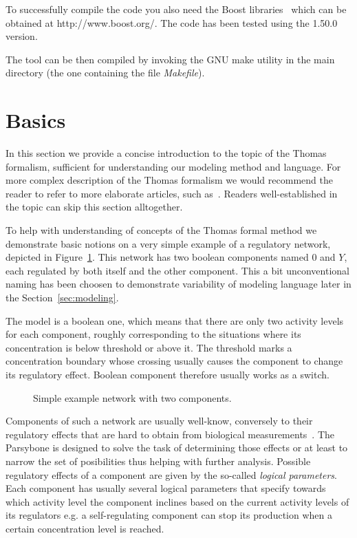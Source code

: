 \documentclass[12pt]{article}
\begin{document}
To successfully compile the code you also need the Boost libraries~\cite{Boost} which can be obtained at http://www.boost.org/. The code has been tested using the 1.50.0 version.

The tool can be then compiled by invoking the GNU make utility in the main directory (the one containing the file \emph{Makefile}).

\section{Basics}
In this section we provide a concise introduction to the topic of the Thomas formalism, sufficient for understanding our modeling method and language. For more complex description of the Thomas formalism we would recommend the reader to refer to more elaborate articles, such as~\cite{ThomasR1991}. Readers well-established in the topic can skip this section alltogether.

To help with understanding of concepts of the Thomas formal method we demonstrate basic notions on a very simple example of a regulatory network, depicted in Figure~\ref{ExampNet}. This network has two boolean components named $0$ and $Y$, each regulated by both itself and the other component. This a bit unconventional naming has been choosen to demonstrate variability of modeling language later in the Section~\ref{sec:modeling}.

The model is a boolean one, which means that there are only two activity levels for each component, roughly corresponding to the situations where its concentration is below threshold or above it. The threshold marks a concentration boundary whose crossing usually causes the component to change its regulatory effect. Boolean component therefore usually works as a switch.

\begin{figure}[b]
\centering
{}
\caption{Simple example network with two components.}
\label{ExampNet}
\end{figure}

Components of such a network are usually well-know, conversely to their regulatory effects that are hard to obtain from biological measurements~\cite{Hecker09}. The Parsybone is designed to solve the task of determining those effects or at least to narrow the set of posibilities thus helping with further analysis. Possible regulatory effects of a component are given by the so-called \emph{logical parameters}. Each component has usually several logical parameters that specify towards which activity level the component inclines based on the current activity levels of its regulators e.g. a self-regulating component can stop its production when a certain concentration level is reached.
\end{document}
